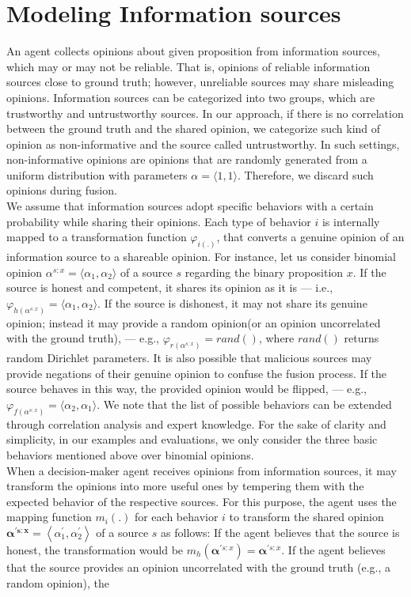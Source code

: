 \documentclass[a4,12pt]{ozu-thesis}
\begin{document}
 
\section{Modeling Information sources}
An agent collects opinions about given proposition from information sources, which may or may not be reliable. That is, opinions of reliable information sources close to ground truth; however, unreliable sources may share misleading opinions.  Information sources can be categorized into two groups, which are trustworthy and untrustworthy sources. In our approach, if there is no correlation between the ground truth and the shared opinion, we categorize such kind of opinion as non-informative and the source called untrustworthy. In such settings, non-informative opinions are opinions that are randomly generated from a uniform distribution  with parameters $\alpha = \langle 1, 1 \rangle$. Therefore, we discard such opinions during fusion.
\\We assume that information sources adopt specific behaviors with a certain probability while sharing their opinions. Each type of behavior $\mathit{i}$ is internally mapped to a transformation function $\mathit{\varphi_{\mathit{i}(.)}}$, that converts a genuine opinion of an information source to a shareable opinion. For instance, let us consider binomial opinion $ \alpha^{s:x} = \langle \alpha_{1}, \alpha_{2}\rangle$ of a source $\mathit{s}$ regarding the binary proposition $\mathit{x}$. If the source is honest and competent, it shares its opinion as it is --- i.e., $\varphi_{\mathit{h}
(\alpha^{s:x})} = \langle \alpha_{1}, \alpha_{2}\rangle$. If the source is dishonest, it may not share its genuine opinion; instead it may provide a random opinion(or an opinion uncorrelated with the ground truth), --- e.g., $ \varphi_{\mathit{r}(\alpha^{s:x})} = rand()$, where $rand()$ returns random Dirichlet parameters. It is also possible that malicious sources may provide negations of their genuine opinion to confuse the fusion process. If the source behaves in this way, the provided opinion would be flipped, --- e.g., $\varphi_{\mathit{f}(\alpha^{s:x})} = \langle \alpha_{2}, 
\alpha_{1}\rangle$. We note that the list of possible behaviors can be extended through correlation analysis and expert knowledge. For the sake of clarity and simplicity, in our examples and evaluations, we only consider the three basic behaviors mentioned above over binomial opinions.
\\When a decision-maker agent receives opinions from information sources, it may transform the opinions into more useful ones by tempering them with the expected behavior of the respective sources. For this purpose, the agent uses the mapping function $\mathit{m_{i}(.)}$ for each behavior $\mathit{i}$ to transform the shared opinion  $\mathit{\mathbf{\alpha^{'s:x}}} = \left \langle \mathit{\alpha_{1}^{'}, \alpha_{2}^{'} }\right \rangle$ of a source $\mathit{s}$ as follows: If the agent believes that the source is honest, the transformation would be $\mathit{m_{h}\left ( \mathbf
{\alpha^{'\mathit{s:x}}} \right )} = \mathbf{\alpha^{'\mathit{s:x}}}$. If the agent believes that the source provides an opinion uncorrelated with the ground truth (e.g., a random opinion), the 
\end{document}
